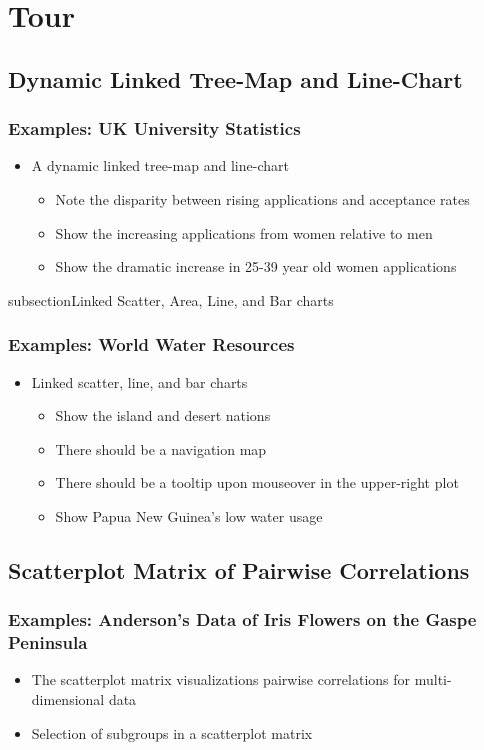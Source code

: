 \documentclass{beamer}
\begin{document}
\section{Tour}


\subsection{Dynamic Linked Tree-Map and Line-Chart}

\begin{frame}
\frametitle{Examples: UK University Statistics}
\begin{itemize}
\item A dynamic linked tree-map and line-chart
    \begin{itemize}
    \item Note the disparity between rising applications and acceptance rates
    \item Show the increasing applications from women relative to men
    \item Show the dramatic increase in 25-39 year old women applications
    \end{itemize}
\end{itemize}
\end{frame}


subsection{Linked Scatter, Area, Line, and Bar charts}

\begin{frame}
\frametitle{Examples: World Water Resources}
\begin{itemize}
\item Linked scatter, line, and bar charts
    \begin{itemize}
    \item Show the island and desert nations
    \item There should be a navigation map
    \item There should be a tooltip upon mouseover in the upper-right plot
    \item Show Papua New Guinea's low water usage
    \end{itemize}
\end{itemize}
\end{frame}


\subsection{Scatterplot Matrix of Pairwise Correlations}


\begin{frame}
\frametitle{Examples: Anderson's Data of Iris Flowers on the Gaspe Peninsula}
\begin{itemize}
\item The scatterplot matrix visualizations pairwise correlations for multi-dimensional data
\item Selection of subgroups in a scatterplot matrix
\end{itemize}
\end{frame}
\end{document}
